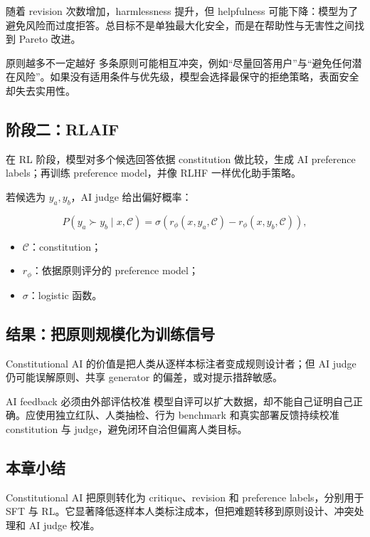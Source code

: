 随着 revision 次数增加，harmlessness 提升，但 helpfulness 可能下降：模型为了避免风险而过度拒答。总目标不是单独最大化安全，而是在帮助性与无害性之间找到 Pareto 改进。


\begin{warningbox}{原则越多不一定越好}
多条原则可能相互冲突，例如“尽量回答用户”与“避免任何潜在风险”。如果没有适用条件与优先级，模型会选择最保守的拒绝策略，表面安全却失去实用性。
\end{warningbox}

\subsection{阶段二：RLAIF}

在 RL 阶段，模型对多个候选回答依据 constitution 做比较，生成 AI preference labels；再训练 preference model，并像 RLHF 一样优化助手策略。


若候选为 $y_a,y_b$，AI judge 给出偏好概率：

$$
P(y_a\succ y_b\mid x,\mathcal C)
=\sigma\!\left(r_\phi(x,y_a,\mathcal C)-r_\phi(x,y_b,\mathcal C)\right),
$$

\begin{itemize}
    \item $\mathcal C$：constitution；
    \item $r_\phi$：依据原则评分的 preference model；
    \item $\sigma$：logistic 函数。
\end{itemize}

\subsection{结果：把原则规模化为训练信号}


Constitutional AI 的价值是把人类从逐样本标注者变成规则设计者；但 AI judge 仍可能误解原则、共享 generator 的偏差，或对提示措辞敏感。

\begin{importantbox}{AI feedback 必须由外部评估校准}
模型自评可以扩大数据，却不能自己证明自己正确。应使用独立红队、人类抽检、行为 benchmark 和真实部署反馈持续校准 constitution 与 judge，避免闭环自洽但偏离人类目标。
\end{importantbox}

\subsection{本章小结}

Constitutional AI 把原则转化为 critique、revision 和 preference labels，分别用于 SFT 与 RL。它显著降低逐样本人类标注成本，但把难题转移到原则设计、冲突处理和 AI judge 校准。

